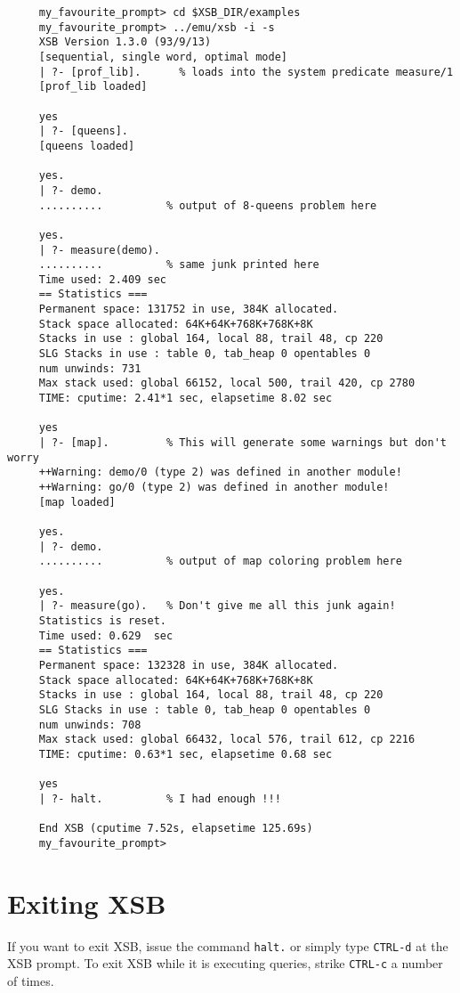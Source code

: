 {\footnotesize
 \begin{verbatim}
     my_favourite_prompt> cd $XSB_DIR/examples
     my_favourite_prompt> ../emu/xsb -i -s
     XSB Version 1.3.0 (93/9/13)
     [sequential, single word, optimal mode]
     | ?- [prof_lib].      % loads into the system predicate measure/1
     [prof_lib loaded]

     yes
     | ?- [queens].
     [queens loaded]

     yes.
     | ?- demo.
     ..........          % output of 8-queens problem here

     yes.
     | ?- measure(demo).
     ..........          % same junk printed here
     Time used: 2.409 sec
     == Statistics ===      
     Permanent space: 131752 in use, 384K allocated.
     Stack space allocated: 64K+64K+768K+768K+8K
     Stacks in use : global 164, local 88, trail 48, cp 220
     SLG Stacks in use : table 0, tab_heap 0 opentables 0
     num unwinds: 731
     Max stack used: global 66152, local 500, trail 420, cp 2780
     TIME: cputime: 2.41*1 sec, elapsetime 8.02 sec

     yes
     | ?- [map].         % This will generate some warnings but don't worry
     ++Warning: demo/0 (type 2) was defined in another module!
     ++Warning: go/0 (type 2) was defined in another module!
     [map loaded]

     yes.
     | ?- demo.
     ..........          % output of map coloring problem here

     yes.
     | ?- measure(go).   % Don't give me all this junk again!
     Statistics is reset.
     Time used: 0.629  sec
     == Statistics ===      
     Permanent space: 132328 in use, 384K allocated.
     Stack space allocated: 64K+64K+768K+768K+8K
     Stacks in use : global 164, local 88, trail 48, cp 220
     SLG Stacks in use : table 0, tab_heap 0 opentables 0
     num unwinds: 708
     Max stack used: global 66432, local 576, trail 612, cp 2216
     TIME: cputime: 0.63*1 sec, elapsetime 0.68 sec

     yes
     | ?- halt.          % I had enough !!!

     End XSB (cputime 7.52s, elapsetime 125.69s)
     my_favourite_prompt>
 \end{verbatim}
}


\section{Exiting XSB}

If you want to exit XSB, issue the command \verb'halt.' or
simply type \verb'CTRL-d' at the XSB prompt. To exit XSB while it is
executing queries, strike \verb'CTRL-c' a number of times.


